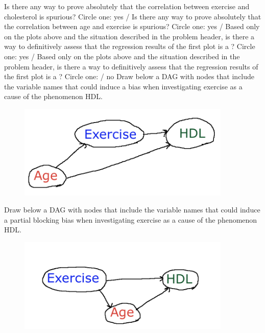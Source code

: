 \documentclass[12pt]{article}
\begin{document}
\begin{enumerate}

 Is there any way to prove absolutely that the correlation between exercise and cholesterol is spurious? Circle one: yes /   
 Is there any way to prove absolutely that the correlation between age and exercise is spurious? Circle one: yes /   
 Based only on the plots above and the situation described in the problem header, is there a way to definitively assess that the regression results of the first plot is a ? Circle one: yes /   
 Based only on the plots above and the situation described in the problem header, is there a way to definitively assess that the regression results of the first plot is a ? Circle one:  / no  
 Draw below a DAG with nodes that include the variable names that could induce a  bias when investigating exercise as a cause of the phenomenon HDL. 


\vspace{-0.2cm}
\begin{figure}[htp]
\centering
\includegraphics[width=4in]{simpsons}
\end{figure}
\FloatBarrier
\vspace{-0.7cm}

\pagebreak
{} Draw below a DAG with nodes that include the variable names that could induce a partial blocking bias when investigating exercise as a cause of the phenomenon HDL. 

\vspace{-0.2cm}
\begin{figure}[htp]
\centering
\includegraphics[width=4in]{partial_blocking}
\end{figure}
\FloatBarrier
\vspace{-0.7cm}

\end{enumerate}
\end{document}
